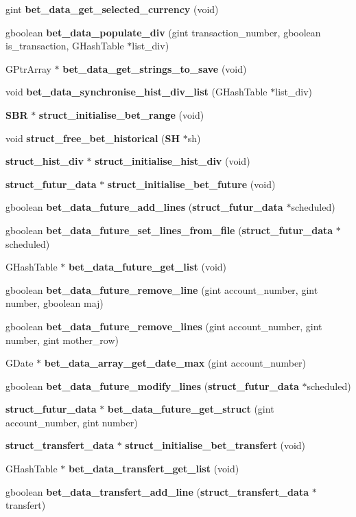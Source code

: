 \begin{DoxyCompactItemize}
\item 
gint {\bf bet\_\-data\_\-get\_\-selected\_\-currency} (void)
\item 
gboolean {\bf bet\_\-data\_\-populate\_\-div} (gint transaction\_\-number, gboolean is\_\-transaction, GHashTable $\ast$list\_\-div)
\item 
GPtrArray $\ast$ {\bf bet\_\-data\_\-get\_\-strings\_\-to\_\-save} (void)
\item 
void {\bf bet\_\-data\_\-synchronise\_\-hist\_\-div\_\-list} (GHashTable $\ast$list\_\-div)
\item 
{\bf SBR} $\ast$ {\bf struct\_\-initialise\_\-bet\_\-range} (void)
\item 
void {\bf struct\_\-free\_\-bet\_\-historical} ({\bf SH} $\ast$sh)
\item 
{\bf struct\_\-hist\_\-div} $\ast$ {\bf struct\_\-initialise\_\-hist\_\-div} (void)
\item 
{\bf struct\_\-futur\_\-data} $\ast$ {\bf struct\_\-initialise\_\-bet\_\-future} (void)
\item 
gboolean {\bf bet\_\-data\_\-future\_\-add\_\-lines} ({\bf struct\_\-futur\_\-data} $\ast$scheduled)
\item 
gboolean {\bf bet\_\-data\_\-future\_\-set\_\-lines\_\-from\_\-file} ({\bf struct\_\-futur\_\-data} $\ast$scheduled)
\item 
GHashTable $\ast$ {\bf bet\_\-data\_\-future\_\-get\_\-list} (void)
\item 
gboolean {\bf bet\_\-data\_\-future\_\-remove\_\-line} (gint account\_\-number, gint number, gboolean maj)
\item 
gboolean {\bf bet\_\-data\_\-future\_\-remove\_\-lines} (gint account\_\-number, gint number, gint mother\_\-row)
\item 
GDate $\ast$ {\bf bet\_\-data\_\-array\_\-get\_\-date\_\-max} (gint account\_\-number)
\item 
gboolean {\bf bet\_\-data\_\-future\_\-modify\_\-lines} ({\bf struct\_\-futur\_\-data} $\ast$scheduled)
\item 
{\bf struct\_\-futur\_\-data} $\ast$ {\bf bet\_\-data\_\-future\_\-get\_\-struct} (gint account\_\-number, gint number)
\item 
{\bf struct\_\-transfert\_\-data} $\ast$ {\bf struct\_\-initialise\_\-bet\_\-transfert} (void)
\item 
GHashTable $\ast$ {\bf bet\_\-data\_\-transfert\_\-get\_\-list} (void)
\item 
gboolean {\bf bet\_\-data\_\-transfert\_\-add\_\-line} ({\bf struct\_\-transfert\_\-data} $\ast$transfert)

\end{DoxyCompactItemize}
